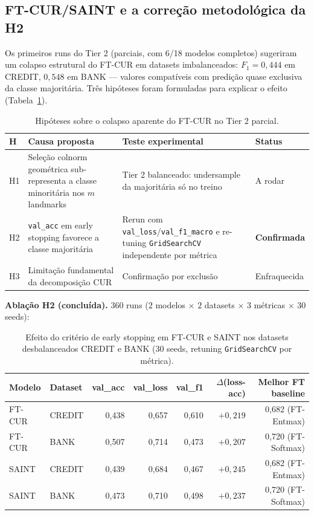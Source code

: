 \documentclass[12pt,a4paper]{article}
\begin{document}
\subsection{FT-CUR/SAINT e a correção metodológica da H2}
\label{sec:tier2_ftcur_limit}

Os primeiros runs do Tier 2 (parciais, com 6/18 modelos completos) sugeriram
um colapso estrutural do FT-CUR em datasets imbalanceados: $F_1 = 0{,}444$
em CREDIT, $0{,}548$ em BANK --- valores compatíveis com predição quase
exclusiva da classe majoritária. Três hipóteses foram formuladas para
explicar o efeito (Tabela~\ref{tab:hipoteses_ftcur}).

\begin{table}[H]
\centering
\caption{Hipóteses sobre o colapso aparente do FT-CUR no Tier 2 parcial.}
\label{tab:hipoteses_ftcur}
\small
\begin{tabular}{lp{4.2cm}p{4.8cm}l}
\toprule
\textbf{H} & \textbf{Causa proposta} & \textbf{Teste experimental} & \textbf{Status} \\
\midrule
H1 & Seleção colnorm geométrica
   sub-representa a classe minoritária nos $m$ landmarks
   & Tier 2 balanceado: undersample da majoritária só no treino
   & A rodar \\
\addlinespace
H2 & \texttt{val\_acc} em early stopping favorece a classe majoritária
   & Rerun com \texttt{val\_loss}/\texttt{val\_f1\_macro} e re-tuning
     \texttt{GridSearchCV} independente por métrica
   & \textbf{Confirmada} \\
\addlinespace
H3 & Limitação fundamental da decomposição CUR
   & Confirmação por exclusão
   & Enfraquecida \\
\bottomrule
\end{tabular}
\end{table}

\textbf{Ablação H2 (concluída).} 360 runs ($2$ modelos $\times$ $2$ datasets
$\times$ $3$ métricas $\times$ $30$ seeds):

\begin{table}[H]
\centering
\caption{Efeito do critério de early stopping em FT-CUR e SAINT nos datasets
desbalanceados CREDIT e BANK (30 seeds, retuning \texttt{GridSearchCV} por métrica).}
\label{tab:h2_results}
\begin{tabular}{llrrrrr}
\toprule
\textbf{Modelo} & \textbf{Dataset} & \textbf{val\_acc} & \textbf{val\_loss}
                & \textbf{val\_f1} & \textbf{$\Delta$(loss-acc)}
                & \textbf{Melhor FT baseline} \\
\midrule
FT-CUR & CREDIT & 0,438 & 0,657 & 0,610 & $+0,219$ & 0,682 (FT-Entmax) \\
FT-CUR & BANK   & 0,507 & 0,714 & 0,473 & $+0,207$ & 0,720 (FT-Softmax) \\
SAINT  & CREDIT & 0,439 & 0,684 & 0,467 & $+0,245$ & 0,682 (FT-Entmax) \\
SAINT  & BANK   & 0,473 & 0,710 & 0,498 & $+0,237$ & 0,720 (FT-Softmax) \\
\bottomrule
\end{tabular}
\end{table}
\end{document}
